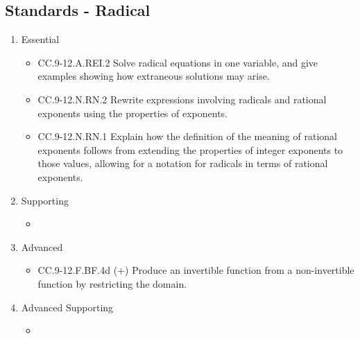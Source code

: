 \documentclass{article}
\begin{document}
\subsection*{Standards - Radical}
\begin{enumerate}
	\item Essential
	\begin{itemize}
		\item CC.9-12.A.REI.2 Solve radical equations in one variable, and give examples showing how extraneous solutions may arise.
		\item CC.9-12.N.RN.2  Rewrite expressions involving radicals and rational exponents using the properties of exponents.
		\item CC.9-12.N.RN.1 Explain how the definition of the meaning of rational exponents follows from extending the properties of integer exponents to those values, allowing for a notation for radicals in terms of rational exponents. 
	\end{itemize}		
	\item Supporting
	\begin{itemize}
		\item
	\end{itemize}
	\item Advanced
	\begin{itemize}
		\item CC.9-12.F.BF.4d (+) Produce an invertible function from a non-invertible function by restricting the domain.
	\end{itemize}
	\item Advanced Supporting
	\begin{itemize}
		\item
	\end{itemize}
\end{enumerate}
\newpage
\end{document}
